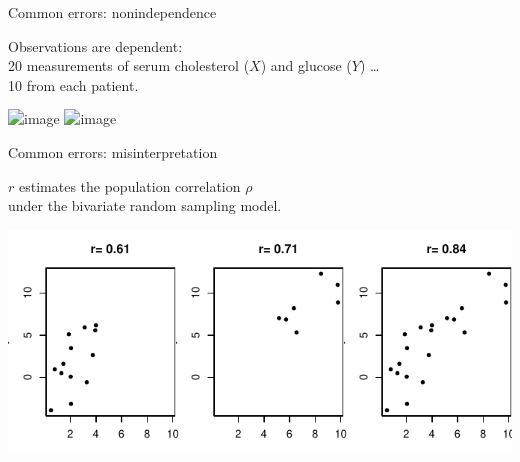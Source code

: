 % 
% 
% 



\begin{frame}{Common errors: nonindependence}


  \alert{ Observations are dependent: } \\

  20 measurements of serum cholesterol ($X$) and glucose ($Y$) \ldots \\
  10 from each patient.
  \vspace{2em}

      \begin{center}
        \includegraphics<1>[width=\textwidth]{nonindep-0}
        \includegraphics<2>[width=\textwidth]{nonindep}
      \end{center}

\end{frame}


\begin{frame}{Common errors: misinterpretation}
    
  $r$ estimates the \alert{population correlation} $\rho$ \\
  under the bivariate random sampling model.

  \vspace{2em}


      \begin{center}
        \includegraphics[width=\textwidth]{r-interp}
      \end{center}


\end{frame}

